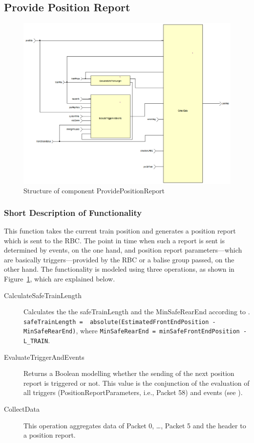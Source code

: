 \subsection{Provide Position Report}\label{sss:provposrep}

\begin{figure}[ht]
\centering
\includegraphics[width=\textwidth]{../images/ProvidePositionReport.pdf}
\caption{Structure of component ProvidePositionReport}\label{fig:provideposrep}
\end{figure}

\subsubsection{Short Description of Functionality}
This function takes the current train position and generates a position report which is sent to the RBC. The point in time when such a report is sent is determined by events, on the one hand, and position report parameters---which are basically triggers---provided by the RBC or a balise group passed, on the other hand. The functionality is modeled using three operations, as shown in Figure~\ref{fig:provideposrep}, which are explained below.
\begin{description}
	\item[CalculateSafeTrainLength] Calculates the the safeTrainLength and the MinSafeRearEnd according to \cite[Chapter~3.6.5.2.4/5]{subset-026}. \\
\verb+safeTrainLength =  absolute(EstimatedFrontEndPosition - MinSafeRearEnd)+, where
\verb+MinSafeRearEnd = minSafeFrontEndPosition - L_TRAIN+.
	\item[EvaluateTriggerAndEvents] Returns a Boolean modelling whether the sending of the next position report is triggered or not. This value is the conjunction of the evaluation of all triggers (PositionReportParameters, i.e., Packet 58) and events (see \cite[Chapter~3.6.5.1.4]{subset-026}).
	\item[CollectData] This operation aggregates data of Packet 0, \dots, Packet 5 and the header to a position report.
\end{description}

